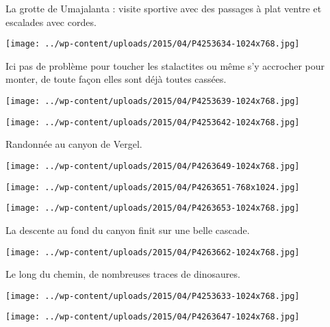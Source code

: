  La grotte de Umajalanta : visite sportive avec des passages à plat ventre et escalades avec cordes. 
\begin{center} \texttt{[image: ../wp-content/uploads/2015/04/P4253634-1024x768.jpg]} \end{center}

\pagebreak
 Ici pas de problème pour toucher les stalactites ou même s'y accrocher pour monter, de toute façon elles sont déjà toutes cassées. 
\begin{center} \texttt{[image: ../wp-content/uploads/2015/04/P4253639-1024x768.jpg]} \end{center}
\begin{center} \texttt{[image: ../wp-content/uploads/2015/04/P4253642-1024x768.jpg]} \end{center}

\pagebreak
Randonnée au canyon de Vergel. 
\begin{center} \texttt{[image: ../wp-content/uploads/2015/04/P4263649-1024x768.jpg]} \end{center}
\begin{center} \texttt{[image: ../wp-content/uploads/2015/04/P4263651-768x1024.jpg]} \end{center}
\begin{center} \texttt{[image: ../wp-content/uploads/2015/04/P4263653-1024x768.jpg]} \end{center}

 La descente au fond du canyon finit sur une belle cascade. 
\begin{center} \texttt{[image: ../wp-content/uploads/2015/04/P4263662-1024x768.jpg]} \end{center}

\pagebreak
 Le long du chemin, de nombreuses traces de dinosaures. 
\begin{center} \texttt{[image: ../wp-content/uploads/2015/04/P4253633-1024x768.jpg]} \end{center}
\begin{center} \texttt{[image: ../wp-content/uploads/2015/04/P4263647-1024x768.jpg]} \end{center}